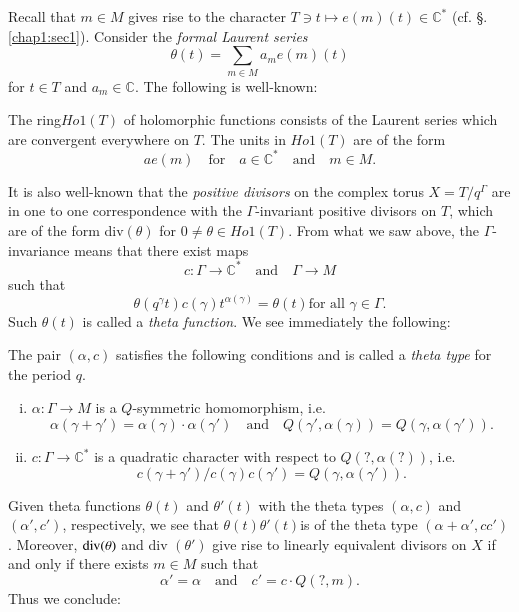 Recall that $m \in M$ gives rise to the character $T \ni t \mapsto
e(m) (t) \in \mathbb{C}^*$ (cf. \S. \ref{chap1:sec1}). Consider the
\textit{formal 
  Laurent series} 
$$
\theta (t) = \sum_{m \in M} a_m e(m) (t) 
$$
for $t \in T$ and $a_m \in \mathbb{C}$. The following is well-known: 

\begin{prop}\label{chap2:prop11.1}
The ring\pageoriginale $Ho1(T)$ of holomorphic functions consists of the Laurent
series which are convergent everywhere on $T$. The units in $Ho1(T)$
are of the form 
$$
ae(m) \quad \text{for} \quad  a \in \mathbb{C}^* \quad  \text{and}
\quad   m \in M. 
$$
\end{prop}

It is also well-known that the \textit{positive divisors} on the
complex torus $X = T/q^\Gamma$ are in one to one correspondence with
the $\Gamma$-invariant positive divisors on $T$, which are of the form
div$ (\theta)$ for $ 0 \neq \theta \in Ho1 (T)$. From what
we saw above, the $\Gamma$-invariance means that there exist maps 
$$
c : \Gamma \to \mathbb{C}^* \quad \text{and}\quad \Gamma \to M 
$$
such that
\begin{equation*}
\theta (q^\gamma t) c (\gamma) t^{\alpha(\gamma)} = \theta (t) \text {
  for all } \gamma \in \Gamma. \tag{*} 
\end{equation*}
Such $\theta (t)$ is called a \textit{theta function}. We see
immediately the following: 

\setcounter{lemma}{1}
\begin{lemma}\label{chap2:lem11.2}%
The pair $(\alpha, c)$ satisfies the following conditions and is
called a \textit{theta type} for the period $q$. 
\begin{enumerate}[(i)]
\item $\alpha : \Gamma \to M$ is a $Q$-symmetric homomorphism, i.e.
$$
\alpha(\gamma + \gamma') = \alpha (\gamma) \cdot \alpha(\gamma') \quad
\text{and} \quad  Q(\gamma', \alpha(\gamma)) = Q(\gamma, \alpha(\gamma')).
$$

\item $c : \Gamma \to \mathbb{C}^*$ is a quadratic character with
  respect to $Q (?, \alpha(?))$, i.e. 
$$
c(\gamma + \gamma')/c(\gamma)c(\gamma') = Q(\gamma, \alpha
(\gamma')). 
$$
\end{enumerate}
\end{lemma}

Given theta functions $\theta (t)$ and $\theta' (t)$ with the theta
types $(\alpha, c)$ and $(\alpha', c')$, respectively, we see that
$\theta (t) \theta' (t)$\pageoriginale is of the theta type $(\alpha +
\alpha', cc')$. Moreover, $\operatorname{div}(\theta)$ and div $(\theta')$ give rise
to linearly equivalent divisors on $X$ if and only if there exists $m \in
M$ such that  
$$
\alpha' = \alpha \quad \text{and} \quad c' = c \cdot Q (?, m). 
$$ 
Thus we conclude:

